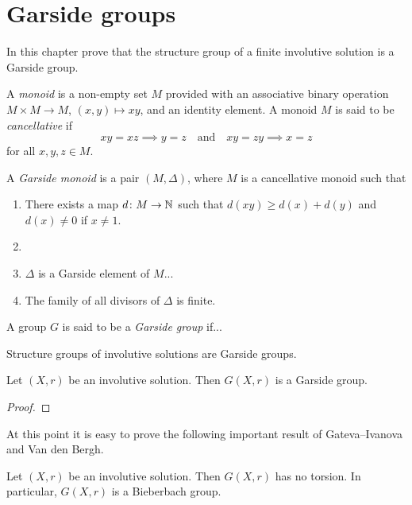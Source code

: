 \chapter{Garside groups}

In this chapter prove that the structure group of a finite involutive solution
is a Garside group. 

A \emph{monoid} is a non-empty set $M$ provided 
with an associative binary operation $M\times M\to M$, $(x,y)\mapsto xy$, 
and an identity element. A monoid $M$ is said to be \emph{cancellative} 
if
\[
xy=xz\implies y=z
\quad
\text{and}
\quad 
xy=zy\implies x=z
\]
for all $x,y,z\in M$. 

\begin{definition}
A \emph{Garside monoid} is a pair $(M,\Delta)$, where $M$ is a cancellative monoid such that
\begin{enumerate}
    \item There exists a map $d\colon M\to\mathbb{N}$ such that $d(xy)\geq d(x)+d(y)$ and $d(x)\ne0$ if $x\ne 1$. 
    \item 
    \item $\Delta$ is a Garside element of $M$...
    \item The family of all divisors of $\Delta$ is finite. 
\end{enumerate}
\end{definition}

\begin{definition}
A group $G$ is said to be a \emph{Garside group} if...
\end{definition}

Structure groups of involutive solutions are Garside groups. 

\begin{theorem}
\label{thm:Chouraqui}
Let $(X,r)$ be an involutive solution. Then $G(X,r)$ is a Garside group.
\end{theorem}

\begin{proof}

\end{proof}

At this point it is easy to prove the following important result 
of Gateva--Ivanova and Van den Bergh. 

\begin{theorem}
\label{thm:torsion_free}
Let $(X,r)$ be an involutive solution. Then $G(X,r)$ has no torsion. In particular, $G(X,r)$ is a Bieberbach group.
\end{theorem}

